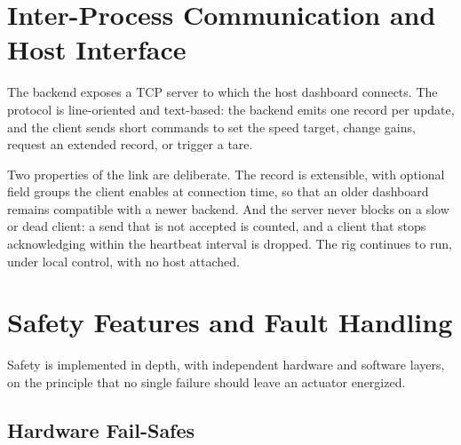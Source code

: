 


\section{Inter-Process Communication and Host Interface}
\label{sec:plat-ipc}

The backend exposes a TCP server to which the host dashboard connects. The protocol is line-oriented and text-based: the backend emits one record per update, and the client sends short commands to set the speed target, change gains, request an extended record, or trigger a tare.

Two properties of the link are deliberate. The record is extensible, with optional field groups the client enables at connection time, so that an older dashboard remains compatible with a newer backend. And the server never blocks on a slow or dead client: a send that is not accepted is counted, and a client that stops acknowledging within the heartbeat interval is dropped. The rig continues to run, under local control, with no host attached.



\section{Safety Features and Fault Handling}
\label{sec:plat-safety}

Safety is implemented in depth, with independent hardware and software layers, on the principle that no single failure should leave an actuator energized.

\subsection{Hardware Fail-Safes}
\label{subsec:plat-failsafe}


